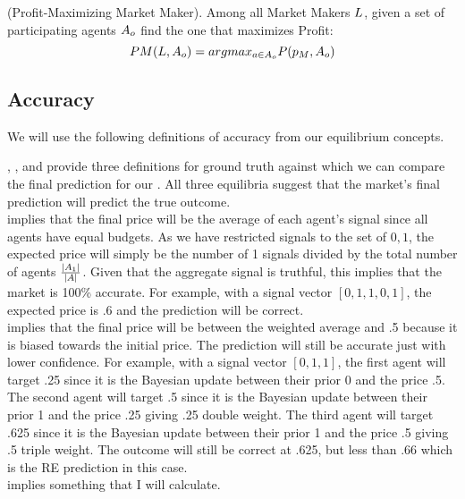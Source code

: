 \begin{definition} (Profit-Maximizing Market Maker).
\label{def:pmmm}
Among all Market Makers $L$, given a set of participating agents $A_o$ find the one that maximizes Profit:
$$ PM(L, A_o) = arg max_{a \in A_o} P(p_M, A_o)$$
\end{definition}

\subsection{Accuracy}
We will use the following definitions of accuracy from our equilibrium concepts.

, , and  provide three definitions for ground truth against which we can compare the final prediction for our . All three equilibria suggest that the market's final prediction will predict the true outcome. \\

 implies that the final price will be the average of each agent's signal since all agents have equal budgets. As we have restricted signals to the set of ${0,1}$, the expected price will simply be the number of 1 signals divided by the total number of agents $\frac{|A_1|}{|A|}$. Given that the aggregate signal is truthful, this implies that the market is 100\% accurate. For example, with a signal vector $\left[0,1,1,0,1\right]$, the expected price is .6 and the prediction will be correct. \\

 implies that the final price will be between the weighted average and .5 because it is biased towards the initial price. The prediction will still be accurate just with lower confidence. For example, with a signal vector $\left[0,1,1\right]$, the first agent will target .25 since it is the Bayesian update between their prior 0 and the price .5. The second agent will target .5 since it is the Bayesian update between their prior 1 and the price .25 giving .25 double weight. The third agent will target .625 since it is the Bayesian update between their prior 1 and the price .5 giving .5 triple weight. The outcome will still be correct at .625, but less than .66 which is the RE prediction in this case.\\

 implies something that I will calculate.\\
